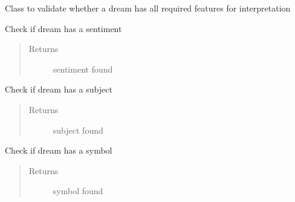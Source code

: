 \documentclass[letterpaper,10pt,english]{sphinxmanual}
\begin{document}
\begin{fulllineitems}
\label{\detokenize{index:Fralysis.DreamValidator.DreamValidator}}
Class to validate whether a dream has all required features for interpretation

\begin{fulllineitems}
\label{\detokenize{index:Fralysis.DreamValidator.DreamValidator.has_rating}}
Check if dream has a sentiment
\begin{quote}\begin{description}
\item[{Returns}] \leavevmode
sentiment found

\end{description}\end{quote}

\end{fulllineitems}


\begin{fulllineitems}
\label{\detokenize{index:Fralysis.DreamValidator.DreamValidator.has_subject}}
Check if dream has a subject
\begin{quote}\begin{description}
\item[{Returns}] \leavevmode
subject found

\end{description}\end{quote}

\end{fulllineitems}


\begin{fulllineitems}
\label{\detokenize{index:Fralysis.DreamValidator.DreamValidator.has_topic}}
Check if dream has a symbol
\begin{quote}\begin{description}
\item[{Returns}] \leavevmode
symbol found


\end{description}
\end{quote}
\end{fulllineitems}
\end{fulllineitems}
\end{document}
